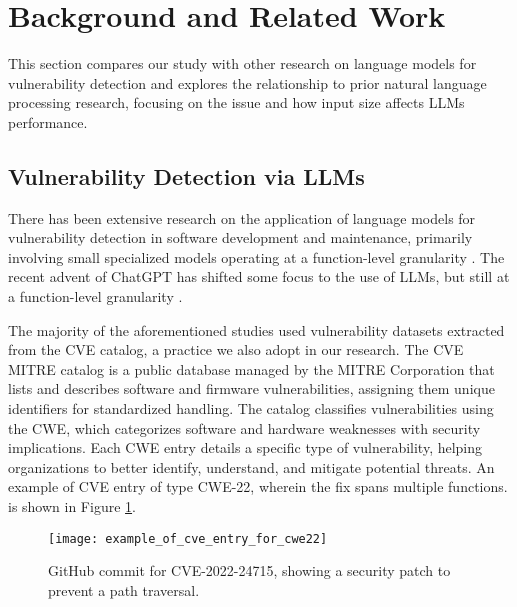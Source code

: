 \section{Background and Related Work}
\label{sec:related_work} \label{sec:background}
	
	This section compares our study with other research on language models for vulnerability detection and explores the relationship to prior natural language processing research, focusing on the  issue and how input size affects \acp{LLM} performance.
	
	\subsection{Vulnerability Detection via LLMs} \label{sec:related_work:bug_detection} \label{sec:background:cwe_n_cve}
	
	There has been extensive research on the application of language models for vulnerability detection in software development and maintenance, primarily involving small specialized models operating at a function-level granularity \cite{DBLP:journals/corr/abs-2401-15468,DBLP:conf/kbse/ZhouKXLHL23,DBLP:journals/ese/NapierBW23,DBLP:conf/raid/0001DACW23,cheshkov2023evaluation,DBLP:journals/corr/abs-2308-12697,LIU2024107458}. The recent advent of ChatGPT has shifted some focus to the use of \acp{LLM}, but still at a function-level granularity \cite{DBLP:journals/corr/abs-2401-15468,steenhoek2024comprehensive,purba2023software,DBLP:conf/acsac/ThapaJACPN22}.
	
	The majority of the aforementioned studies used vulnerability datasets extracted from the \ac{CVE} catalog, a practice we also adopt in our research.
	The \ac{CVE} MITRE catalog is a public database managed by the MITRE Corporation that lists and describes software and firmware vulnerabilities, assigning them unique identifiers for standardized handling. The catalog classifies vulnerabilities using the \acl{CWE}, which categorizes software and hardware weaknesses with security implications. Each \ac{CWE} entry details a specific type of vulnerability, helping organizations to better identify, understand, and mitigate potential threats. An example of \ac{CVE} entry of type CWE-22, wherein the fix spans multiple functions. is shown in Figure \ref{fig:cve_fix}.
	
	\begin{figure}[tbh]
		\centering
		\texttt{[image: example\_of\_cve\_entry\_for\_cwe22]}
		\caption{GitHub commit for CVE-2022-24715, showing a security patch to prevent a path traversal.}
		\label{fig:cve_fix}
	\end{figure}
	
